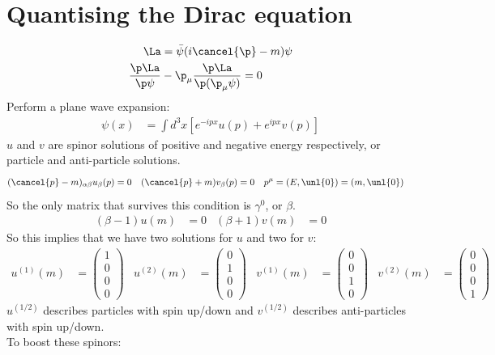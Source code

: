 \documentclass[a4paper, 11pt, normalem]{report}
\begin{document}
\section{Quantising the Dirac equation}
\begin{align}
    \La &= \bar{\psi}(i\cancel{\p}-m)\psi  \\
    \frac{\p\La}{\p\psi} &- \p_\mu\frac{\p\La}{\p(\p_\mu\psi)} = 0
\end{align}
Perform a plane wave expansion:
\begin{align}
    \psi(x) &= \int d^3x \left[e^{-ipx}u(p)+e^{ipx}v(p)\right]
\end{align}
$u$ and $v$ are spinor solutions of positive and negative energy respectively, or particle and anti-particle solutions.
\begin{align}
    (\cancel{p}-m)_{\alpha\beta}u_\beta(p) &= 0 & (\cancel{p}+m)v_\beta(p) &= 0 & p^\mu &= (E,\unl{0}) = (m,\unl{0}) 
\end{align}
So the only matrix that survives this condition is $\gamma^0$, or $\beta$.
\begin{align}
    (\beta-1)u(m) &= 0 & (\beta+1)v(m) &= 0
\end{align}
So this implies that we have two solutions for $u$ and two for $v$:
\begin{align}
    u^{(1)}(m) &= \begin{pmatrix} 1\\0\\0\\0\end{pmatrix} & u^{(2)}(m) &= \begin{pmatrix} 0\\1\\0\\0\end{pmatrix} & v^{(1)}(m) &= \begin{pmatrix} 0\\0\\1\\0\end{pmatrix} & v^{(2)}(m) &= \begin{pmatrix} 0\\0\\0\\1\end{pmatrix}
\end{align}
$u^{(1/2)}$ describes particles with spin up/down and $v^{(1/2)}$ describes anti-particles with spin up/down.\\
To boost these spinors:
\end{document}
